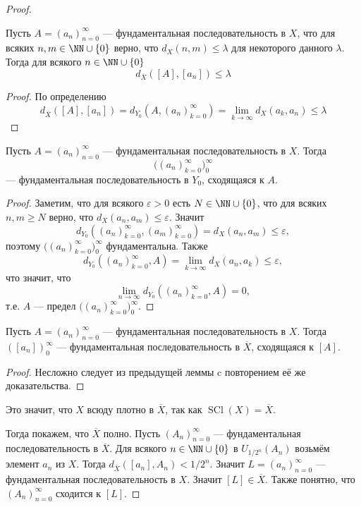 \documentclass[12pt,a4paper]{article}
\DeclareMathOperator{\SCl}{SCl}
\begin{document}
\begin{proof}
        \begin{thlemma}
            Пусть $A = (a_n)_{n=0}^\infty$ --- фундаментальная последовательность в $X$, что для всяких $n, m \in \NN \cup \{0\}$ верно, что $d_X(n, m) \leqslant \lambda$ для некоторого данного $\lambda$. Тогда для всякого $n \in \NN \cup \{0\}$
            \[d_{\overline{X}}([A], [a_n]) \leqslant \lambda\]
        \end{thlemma}

        \begin{proof}
            По определению
            \[d_{\overline{X}}([A], [a_n]) = d_{Y_0}(A, (a_n)_{k=0}^\infty) = \lim_{k \to \infty} d_X(a_k, a_n) \leqslant \lambda\]
        \end{proof}

        \begin{thlemma}
            Пусть $A = (a_n)_{n=0}^\infty$ --- фундаментальная последовательность в $X$. Тогда
            \[\bigl((a_n)_{k=0}^\infty\bigr)_{0}^\infty\]
            --- фундаментальная последовательность в $Y_0$, сходящаяся к $A$.
        \end{thlemma}

        \begin{proof}
            Заметим, что для всякого $\varepsilon > 0$ есть $N \in \NN \cup \{0\}$, что для всяких $n, m \geqslant N$ верно, что $d_X(a_n, a_m) \leqslant \varepsilon$. Значит
            \[d_{Y_0}((a_n)_{k=0}^\infty, (a_m)_{k=0}^\infty) = d_X(a_n, a_m) \leqslant \varepsilon,\]
            поэтому $\bigl((a_n)_{k=0}^\infty\bigr)_{0}^\infty$ фундаментальна. Также
            \[d_{Y_0}((a_n)_{k=0}^\infty, A) = \lim_{k \to \infty} d_X(a_n, a_k) \leqslant \varepsilon,\]
            что значит, что
            \[\lim_{n \to \infty} d_{Y_0}((a_n)_{k=0}^\infty, A) = 0,\]
            т.е. $A$ --- предел $\bigl((a_n)_{k=0}^\infty\bigr)_{0}^\infty$.
        \end{proof}

        \begin{thlemma}
            Пусть $A = (a_n)_{n=0}^\infty$ --- фундаментальная последовательность в $X$. Тогда $([a_n])_{0}^\infty$ --- фундаментальная последовательность в $\overline{X}$, сходящаяся к $[A]$.
        \end{thlemma}

        \begin{proof}
            Несложно следует из предыдущей леммы c повторением её же доказательства.
        \end{proof}

        Это значит, что $X$ всюду плотно в $\overline{X}$, так как $\SCl(X) = \overline{X}$.

        Тогда покажем, что $\overline{X}$ полно. Пусть $(A_n)_{n=0}^\infty$ --- фундаментальная последовательность в $\overline{X}$. Для всякого $n \in \NN \cup \{0\}$ в $U_{1/2^n}(A_n)$ возьмём элемент $a_n$ из $X$. Тогда $d_{\overline{X}}([a_n], A_n) < 1/2^n$. Значит $L = (a_n)_{n=0}^\infty$ --- фундаментальная последовательность в $X$. Значит $[L] \in \overline{X}$. Также понятно, что $(A_n)_{n=0}^\infty$ сходится к $[L]$.
    \end{proof}
\end{document}
